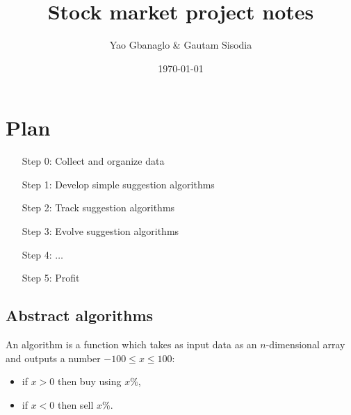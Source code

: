 \documentclass[11pt]{amsart}
\begin{document}
\title{Stock market project notes}
\date{\today}
\author{Yao Gbanaglo \& Gautam Sisodia} 
\address{}
\email{}
\maketitle


\section{Plan}

\begin{enumerate}
\item[Step 0:] Collect and organize data
\item[Step 1:] Develop simple suggestion algorithms 
\item[Step 2:] Track suggestion algorithms
\item[Step 3:] Evolve suggestion algorithms
\item[Step 4:] $\ldots$
\item[Step 5:] Profit
\end{enumerate}

\subsection{Abstract algorithms}

An algorithm is a function which takes as input data as an $n$-dimensional array and outputs a number $-100 \leq x \leq 100$:
\begin{itemize}
\item if $x > 0$ then buy using $x \%$, 
\item if $x < 0$ then sell $x \%$.
\end{itemize}


 
\end{document}
